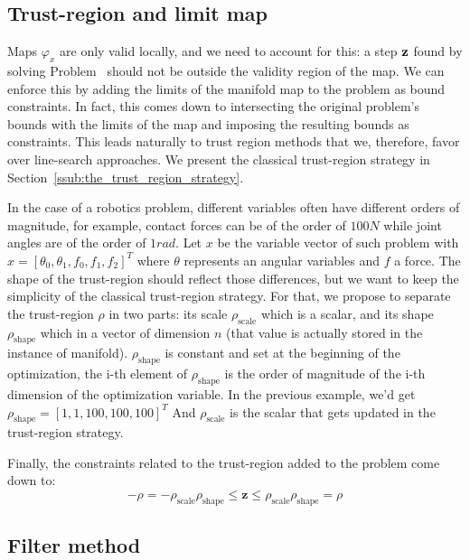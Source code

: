 \subsection{Trust-region and limit map}
\label{sub:trust_region_and_limit_map}

Maps $\varphi_{x}$ are only valid locally, and we need to account for this: a step ${\bf z}$ found by solving Problem~ should not be outside the validity region of the map.
We can enforce this by adding the limits of the manifold map to the problem as bound constraints.
In fact, this comes down to intersecting the original problem's bounds with the limits of the map and imposing the resulting bounds as constraints.
This leads naturally to trust region methods that we, therefore, favor over line-search approaches.
We present the classical trust-region strategy in Section~\ref{ssub:the_trust_region_strategy}.

In the case of a robotics problem, different variables often have different orders of magnitude, for example, contact forces can be of the order of $100N$ while joint angles are of the order of $1rad$.
Let $x$ be the variable vector of such problem with $x={[\theta_0, \theta_1, f_0, f_1, f_2]}^T$ where $\theta$ represents an angular variables and $f$ a force.
The shape of the trust-region should reflect those differences, but we want to keep the simplicity of the classical trust-region strategy.
For that, we propose to separate the trust-region $\rho$ in two parts: its scale $\rho_\text{scale}$ which is a scalar, and its shape $\rho_\text{shape}$ which in a vector of dimension $n$ (that value is actually stored in the instance of manifold).
$\rho_\text{shape}$ is constant and set at the beginning of the optimization, the i-th element of $\rho_\text{shape}$ is the order of magnitude of the i-th dimension of the optimization variable.
In the previous example, we'd get ${\rho_\text{shape}} = {[1,1,100,100,100]}^T$
And $\rho_\text{scale}$ is the scalar that gets updated in the trust-region strategy.

Finally, the constraints related to the trust-region added to the problem come down to:
\begin{equation}
  -\rho = -\rho_\text{scale}\rho_\text{shape} \leq \mathbf{z} \leq \rho_\text{scale}\rho_\text{shape} = \rho
\end{equation}

\subsection{Filter method}
\label{sub:filter_method}

